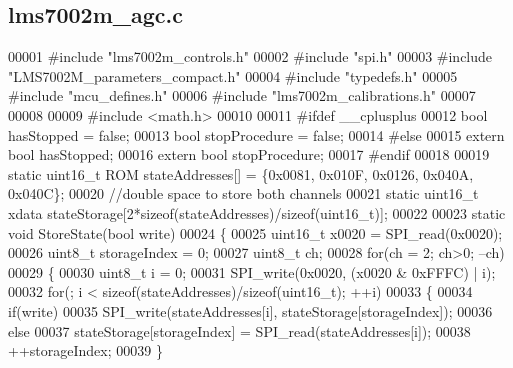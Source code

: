\subsection{lms7002m\+\_\+agc.\+c}
\label{lms7002m__agc_8c_source}

\begin{DoxyCode}
00001 \textcolor{preprocessor}{#include "lms7002m_controls.h"}
00002 \textcolor{preprocessor}{#include "spi.h"}
00003 \textcolor{preprocessor}{#include "LMS7002M_parameters_compact.h"}
00004 \textcolor{preprocessor}{#include "typedefs.h"}
00005 \textcolor{preprocessor}{#include "mcu_defines.h"}
00006 \textcolor{preprocessor}{#include "lms7002m_calibrations.h"}
00007 
00008 
00009 \textcolor{preprocessor}{#include <math.h>}
00010 
00011 \textcolor{preprocessor}{#ifdef \_\_cplusplus}
00012 \textcolor{keywordtype}{bool} hasStopped = \textcolor{keyword}{false};
00013 \textcolor{keywordtype}{bool} stopProcedure = \textcolor{keyword}{false};
00014 \textcolor{preprocessor}{#else}
00015 \textcolor{keyword}{extern} \textcolor{keywordtype}{bool} hasStopped;
00016 \textcolor{keyword}{extern} \textcolor{keywordtype}{bool} stopProcedure;
00017 \textcolor{preprocessor}{#endif}
00018 
00019 \textcolor{keyword}{static} uint16\_t ROM stateAddresses[] = \{0x0081, 0x010F, 0x0126, 0x040A, 0x040C\};
00020 \textcolor{comment}{//double space to store both channels}
00021 \textcolor{keyword}{static} uint16\_t xdata stateStorage[2*\textcolor{keyword}{sizeof}(stateAddresses)/\textcolor{keyword}{sizeof}(uint16\_t)];
00022 
00023 \textcolor{keyword}{static} \textcolor{keywordtype}{void} StoreState(\textcolor{keywordtype}{bool} write)
00024 \{
00025     uint16\_t x0020 = SPI_read(0x0020);
00026     uint8\_t storageIndex = 0;
00027     uint8\_t ch;
00028     \textcolor{keywordflow}{for}(ch = 2; ch>0; --ch)
00029     \{
00030         uint8\_t i = 0;
00031         SPI_write(0x0020, (x0020 & 0xFFFC) | i);
00032         \textcolor{keywordflow}{for}(; i < \textcolor{keyword}{sizeof}(stateAddresses)/\textcolor{keyword}{sizeof}(uint16\_t); ++i)
00033         \{
00034             \textcolor{keywordflow}{if}(write)
00035                 SPI_write(stateAddresses[i], stateStorage[storageIndex]);
00036             \textcolor{keywordflow}{else}
00037                 stateStorage[storageIndex] = SPI_read(stateAddresses[i]);
00038             ++storageIndex;
00039         \}

\end{DoxyCode}
